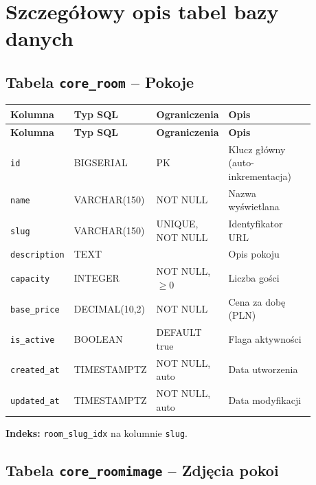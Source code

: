 \documentclass[12pt,a4paper]{article}
\begin{document}
\section{Szczegółowy opis tabel bazy danych}
\label{sec:tabele}

\subsection{Tabela \texttt{core\_room} -- Pokoje}

\begin{longtable}{p{0.2\linewidth}p{0.18\linewidth}p{0.15\linewidth}p{0.35\linewidth}}
\toprule
\textbf{Kolumna} & \textbf{Typ SQL} & \textbf{Ograniczenia} & \textbf{Opis} \\
\midrule
\endfirsthead
\toprule
\textbf{Kolumna} & \textbf{Typ SQL} & \textbf{Ograniczenia} & \textbf{Opis} \\
\midrule
\endhead
\texttt{id} & BIGSERIAL & PK & Klucz główny (auto-inkrementacja) \\
\texttt{name} & VARCHAR(150) & NOT NULL & Nazwa wyświetlana \\
\texttt{slug} & VARCHAR(150) & UNIQUE, NOT NULL & Identyfikator URL \\
\texttt{description} & TEXT & & Opis pokoju \\
\texttt{capacity} & INTEGER & NOT NULL, $\geq 0$ & Liczba gości \\
\texttt{base\_price} & DECIMAL(10,2) & NOT NULL & Cena za dobę (PLN) \\
\texttt{is\_active} & BOOLEAN & DEFAULT true & Flaga aktywności \\
\texttt{created\_at} & TIMESTAMPTZ & NOT NULL, auto & Data utworzenia \\
\texttt{updated\_at} & TIMESTAMPTZ & NOT NULL, auto & Data modyfikacji \\
\bottomrule
\end{longtable}

\textbf{Indeks:} \texttt{room\_slug\_idx} na kolumnie \texttt{slug}.

\subsection{Tabela \texttt{core\_roomimage} -- Zdjęcia pokoi}
\end{document}
